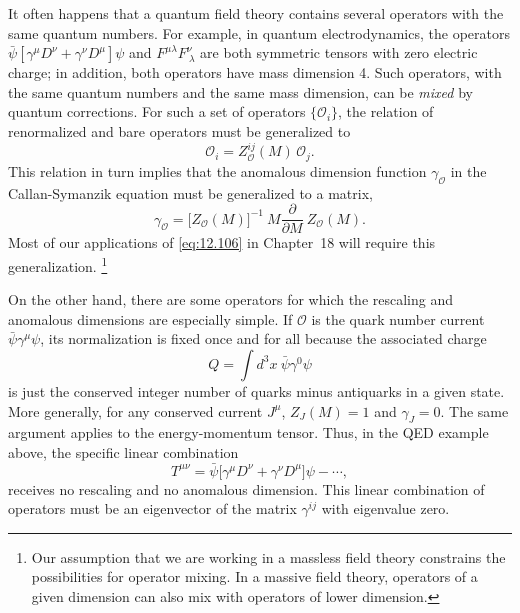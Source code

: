 It often happens that a quantum field theory contains several operators with
the same quantum numbers.  For example, in quantum electrodynamics, the
operators $\bar{\psi}[\gamma^\mu D^\nu + \gamma^\nu D^\mu]\psi$ and
$F^{\mu\lambda}F^{\nu}_{\ \lambda}$ are both symmetric tensors with zero
electric charge; in addition, both operators have mass dimension 4.  Such
operators, with the same quantum numbers and the same mass dimension, can be
\emph{mixed} by quantum corrections.  For such a set of operators
$\{\mathcal{O}_i\}$, the relation of renormalized and bare operators must be
generalized to
\begin{equation}
  \mathcal{O}_i = Z^{ij}_{\mathcal{O}}(M)\,\mathcal{O}_j .
  \label{eq:12.108}
\end{equation}
This relation in turn implies that the anomalous dimension function
$\gamma_{\mathcal{O}}$ in the Callan-Symanzik equation must be generalized to
a matrix,
\begin{equation}
  \gamma_{\mathcal{O}} = \bigl[ Z_{\mathcal{O}}(M) \bigr]^{-1}\ M\frac{\partial}
    {\partial M}\ Z_{\mathcal{O}}(M) .
  \label{eq:12.109}
\end{equation}
Most of our applications of \eqref{eq:12.106} in Chapter~18 will require this
generalization.%
\footnote{Our assumption that we are working in a massless field theory
constrains the possibilities for operator mixing.  In a massive field theory,
operators of a given dimension can also mix with operators of lower
dimension.}

On the other hand, there are some operators for which the rescaling and
anomalous dimensions are especially simple.  If $\mathcal{O}$ is the quark
number current $\bar{\psi}\gamma^\mu\psi$, its normalization is fixed once and
for all because the associated charge
\begin{equation}
  Q = \int d^3x\ \bar{\psi}\gamma^0\psi
\end{equation}
is just the conserved integer number of quarks minus antiquarks in a given
state.  More generally, for any conserved current $J^\mu$,
$Z_J(M) = 1$ and $\gamma_J = 0$.  The same argument applies to the
energy-momentum tensor.  Thus, in the QED example above, the specific linear
combination
\begin{equation}
  T^{\mu\nu} = \bar{\psi}\bigl[ \gamma^\mu D^\nu + \gamma^\nu D^\mu \bigr]\psi
    - \cdots ,
  \label{eq:12.110}
\end{equation}
receives no rescaling and no anomalous dimension.  This linear combination of
operators must be an eigenvector of the matrix $\gamma^{ij}$ with eigenvalue
zero.

